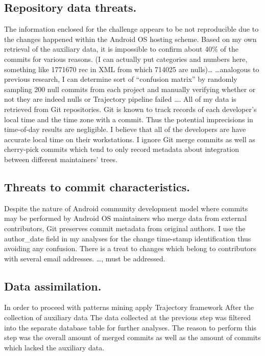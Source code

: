 \documentclass[a4paper,10pt]{article}
\numberwithin{equation}{subsection}
\begin{document}
\subsection{Repository data threats.}
The information enclosed for the challenge appears to be not reproducible due to the changes happened 
within the Android OS hosting scheme. Based on my own retrieval of the auxiliary data, it is impossible 
to confirm about 40\% of the commits for various reasons. 
(I can actually put categories and numbers here, something like
1771670 rec in XML from which 714025 are nulls)\ldots 
\ldots analogous to previous research, I can determine sort of ``confusion matrix'' by 
randomly sampling 200 null commits from each project and manually verifying whether or not they 
are indeed nulls or Trajectory pipeline failed \ldots. 
All of my data is retrieved from Git repositories. Git is known to track records of each 
developer’s local time and the time zone with a commit. Thus the potential imprecisions
in time-of-day results are negligible. I believe that all of the developers are have accurate local 
time on their workstations.
I ignore Git merge commits as well as cherry-pick commits which tend to only record metadata about 
integration between different maintainers’ trees.

\subsection{Threats to commit characteristics.}
Despite the nature of Android community development model where commits may be performed by 
Android OS maintainers who merge data from external contributors, Git preserves commit metadata 
from original authors. I use the author\_date field in my analyses for the change time-stamp identification 
thus avoiding any confusion.
There is a treat to changes which belong to contributors with several email addresses. \ldots, must be addressed.

\subsection{Data assimilation.}
In order to proceed with patterns mining apply Trajectory framework After the collection of auxiliary data The data collected at the previous step was filtered into the separate database table for further analyses.
The reason to perform this step was the overall amount of merged commits as well as the amount of commits
which lacked the auxiliary data.
\end{document}
